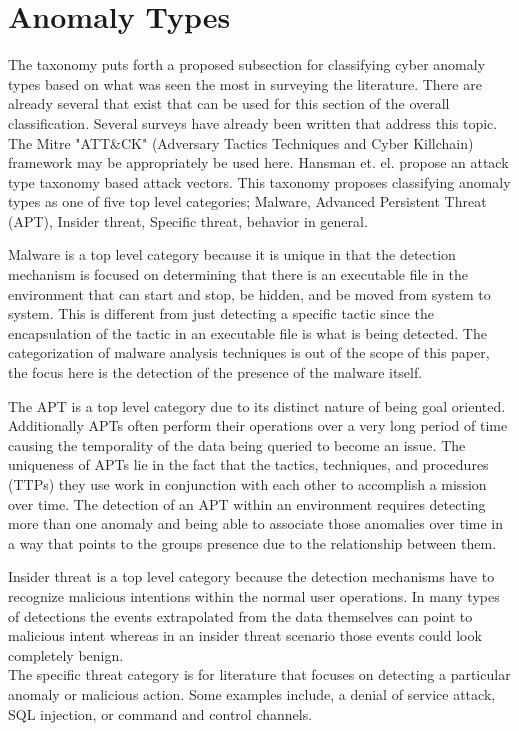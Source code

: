 \section{Anomaly Types}
The taxonomy puts forth a proposed subsection for classifying cyber anomaly types based on what was seen the most in surveying the literature. 
There are already several that exist that can be used for this section of the overall classification. 
Several surveys have already been written that address this topic. The Mitre "ATT\&CK" (Adversary Tactics Techniques and Cyber Killchain) framework may be appropriately be used here\cite{lazarevic2005intrusion}\cite{mitchell2014survey}\cite{axelsson2000intrusion}. 
Hansman et. el. propose an attack type taxonomy based attack vectors\cite{hansman2005taxonomy}.
This taxonomy proposes classifying anomaly types as one of five top level categories; Malware, Advanced Persistent Threat (APT), Insider threat, Specific threat, behavior in general. 

Malware is a top level category because it is unique in that the detection mechanism is focused on determining that there is an executable file in the environment that can start and stop, be hidden, and be moved from system to system.
This is different from just detecting a specific tactic since the encapsulation of the tactic in an executable file is what is being detected. 
The categorization of malware analysis techniques is out of the scope of this paper, the focus here is the detection of the presence of the malware itself. 

The APT is a top level category due to its distinct nature of being goal oriented. 
Additionally APTs often perform their operations over a very long period of time causing the temporality of the data being queried to become an issue.  
The uniqueness of APTs lie in the fact that the tactics, techniques, and procedures (TTPs) they use work in conjunction with each other to accomplish a mission over time. 
The detection of an APT within an environment requires detecting more than one anomaly and being able to associate those anomalies over time in a way that points to the groups presence due to the relationship between them. 

Insider threat is a top level category because the detection mechanisms have to recognize malicious intentions within the normal user operations. 
In many types of detections the events extrapolated from the data themselves can point to malicious intent whereas in an insider threat scenario those events could look completely benign.\\
The specific threat category is for literature that focuses on detecting a particular anomaly or malicious action. 
Some examples include, a denial of service attack, SQL injection, or command and control channels. 

